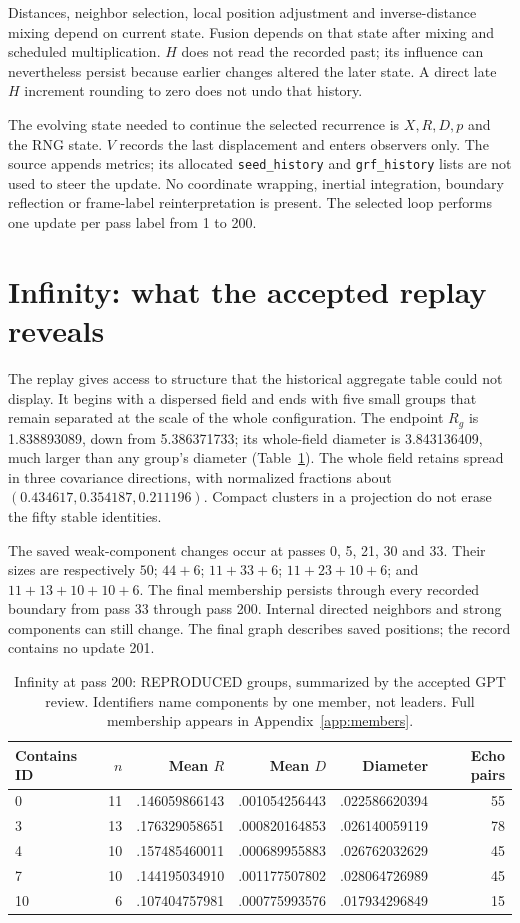 \documentclass[11pt,a4paper]{article}
\newcommand{\ev}[1]{\textsf{\small #1}}
\begin{document}
Distances, neighbor selection, local position adjustment and inverse-distance mixing depend on current state. Fusion depends on that state after mixing and scheduled multiplication. $H$ does not read the recorded past; its influence can nevertheless persist because earlier changes altered the later state. A direct late $H$ increment rounding to zero does not undo that history.

The evolving state needed to continue the selected recurrence is $X,R,D,p$ and the RNG state. $V$ records the last displacement and enters observers only. The source appends metrics; its allocated \texttt{seed\_history} and \texttt{grf\_history} lists are not used to steer the update. No coordinate wrapping, inertial integration, boundary reflection or frame-label reinterpretation is present. The selected loop performs one update per pass label from 1 to 200.

\section{Infinity: what the accepted replay reveals}
\label{sec:s5behavior}
The replay gives access to structure that the historical aggregate table could not display. It begins with a dispersed field and ends with five small groups that remain separated at the scale of the whole configuration. The endpoint $R_g$ is 1.838893089, down from 5.386371733; its whole-field diameter is 3.843136409, much larger than any group's diameter (Table~\ref{tab:groups}). The whole field retains spread in three covariance directions, with normalized fractions about $(0.434617,0.354187,0.211196)$. Compact clusters in a projection do not erase the fifty stable identities.

The saved weak-component changes occur at passes 0, 5, 21, 30 and 33. Their sizes are respectively $50$; $44+6$; $11+33+6$; $11+23+10+6$; and $11+13+10+10+6$. The final membership persists through every recorded boundary from pass 33 through pass 200. Internal directed neighbors and strong components can still change. The final graph describes saved positions; the record contains no update 201.

\begin{table}[ht]
\centering\small
\caption{Infinity at pass 200: \ev{REPRODUCED} groups, summarized by the accepted GPT review. Identifiers name components by one member, not leaders. Full membership appears in Appendix~\ref{app:members}.}
\label{tab:groups}
\begin{tabular}{@{}lrrrrr@{}}\toprule
Contains ID & $n$ & Mean $R$ & Mean $D$ & Diameter & Echo pairs\\\midrule
0 & 11 & .146059866143 & .001054256443 & .022586620394 & 55\\
3 & 13 & .176329058651 & .000820164853 & .026140059119 & 78\\
4 & 10 & .157485460011 & .000689955883 & .026762032629 & 45\\
7 & 10 & .144195034910 & .001177507802 & .028064726989 & 45\\
10 & 6 & .107404757981 & .000775993576 & .017934296849 & 15\\
\bottomrule\end{tabular}
\end{table}
\end{document}
